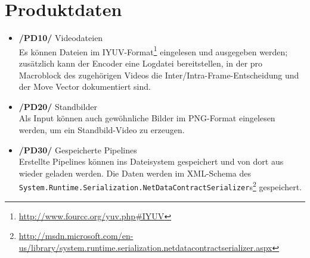 \section{Produktdaten}

\begin{itemize}
	\item \textbf{/PD10/} Videodateien \\
        Es können Dateien im IYUV-Format\footnote{\url{http://www.fourcc.org/yuv.php\#IYUV}} eingelesen und ausgegeben werden; zusätzlich kann der Encoder eine Logdatei bereitstellen, in der pro Macroblock des zugehörigen Videos die Inter/Intra-Frame-Entscheidung und der Move Vector dokumentiert sind.
	\item \textbf{/PD20/} Standbilder \\
        Als Input können auch gewöhnliche Bilder im PNG-Format eingelesen werden, um ein Standbild-Video zu erzeugen.
	\item \textbf{/PD30/} Gespeicherte Pipelines \\
        \sloppy Erstellte Pipelines können ins Dateisystem gespeichert und von dort aus wieder geladen werden. Die Daten werden im XML-Schema des \texttt{System.Runtime.Serialization.NetDataContractSerializer}s\footnote{\url{http://msdn.microsoft.com/en-us/library/system.runtime.serialization.netdatacontractserializer.aspx}} gespeichert.
\end{itemize} \fussy
